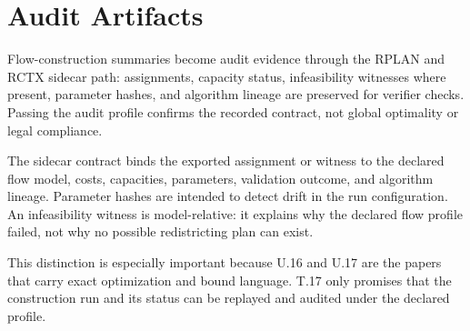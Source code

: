 \section{Audit Artifacts}

Flow-construction summaries become audit evidence through the RPLAN and RCTX
sidecar path: assignments, capacity status, infeasibility witnesses where
present, parameter hashes, and algorithm lineage are preserved for verifier
checks. Passing the audit profile confirms the recorded contract, not global
optimality or legal compliance.

The sidecar contract binds the exported assignment or witness to the declared
flow model, costs, capacities, parameters, validation outcome, and algorithm
lineage. Parameter hashes are intended to detect drift in the run
configuration. An infeasibility witness is model-relative: it explains why the
declared flow profile failed, not why no possible redistricting plan can exist.

This distinction is especially important because U.16 and U.17 are the papers
that carry exact optimization and bound language. T.17 only promises that the
construction run and its status can be replayed and audited under the declared
profile.
